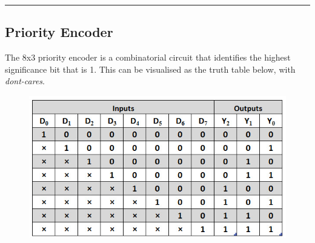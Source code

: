 \documentclass[a4paper, 11pt]{article}
\begin{document}
\hrule
\vspace*{2mm}
\subsection{Priority Encoder}

The 8x3 priority encoder is a combinatorial circuit that identifies the highest significance bit that is 1. This can be visualised as the truth table below, with {\em dont-cares}.
\begin{figure}[H]
\centering
\includegraphics[scale=0.8]{PriorityEncoder_83}
\end{figure}
\end{document}
